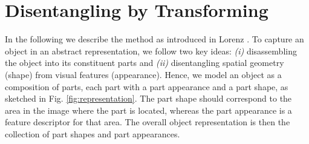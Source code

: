 \chapter{Disentangling by Transforming}\label{sec:method}


	In the following we describe the method as introduced in Lorenz \etal \cite{lorenz19}.
	To capture an object in an abstract representation, we follow two key ideas: \emph{(i)} disassembling the object into its constituent parts and \emph{(ii)} disentangling spatial geometry (shape) from visual features (appearance). Hence, we model an object as a composition of parts, each part with a part appearance and a part shape, as sketched in Fig. \ref{fig:representation}. The part shape should correspond to the area in the image where the part is located, whereas the part appearance is a feature descriptor for that area. The overall object representation is then the collection of part shapes and part appearances. \\
